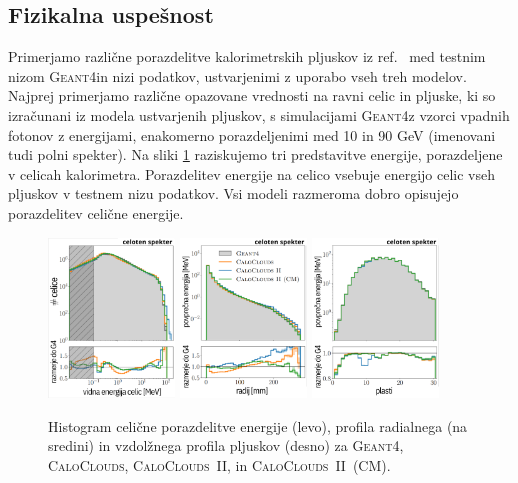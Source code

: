 \documentclass[12pt, a4paper]{article}
\newcommand{\geant}{\textsc{Geant4}\xspace \;}
\newcommand{\caloclouds}{\textsc{CaloClouds}\xspace \;}
\newcommand{\ccedm}{\textsc{CaloClouds~II}\xspace \;}
\newcommand{\cccm}{\textsc{CaloClouds~II~(CM)}\xspace}
\begin{document}
\subsection{Fizikalna uspešnost} 
\label{sec:Results_Physics}

Primerjamo različne porazdelitve kalorimetrskih pljuskov iz ref.~\cite{CaloClouds1} med testnim nizom \geant in nizi podatkov, ustvarjenimi z uporabo vseh treh modelov. Najprej primerjamo različne opazovane vrednosti na ravni celic in pljuske, ki so izračunani iz modela ustvarjenih pljuskov, s simulacijami \geant z vzorci vpadnih fotonov z energijami, enakomerno porazdeljenimi med 10 in 90 GeV (imenovani tudi polni spekter). Na sliki \ref{fig:Ehits_Radial_Spinal} raziskujemo tri predstavitve energije, porazdeljene v celicah kalorimetra. Porazdelitev energije na celico vsebuje energijo celic vseh pljuskov v testnem nizu podatkov. Vsi modeli razmeroma dobro opisujejo porazdelitev celične energije.

\begin{figure}[htb!]
    \centering
    \includegraphics[width=0.30\textwidth]{Images_SLO/hits_SLO.png}
    \includegraphics[width=0.30\textwidth]{Images_SLO/radial_SLO.png}
    \includegraphics[width=0.30\textwidth]{Images_SLO/spinal_SLO.png}
    \caption{Histogram celične porazdelitve energije (levo), profila radialnega (na sredini) in vzdolžnega profila pljuskov (desno) za \geant, \caloclouds, \ccedm, in \cccm.}
    \label{fig:Ehits_Radial_Spinal}
\end{figure}
\end{document}
